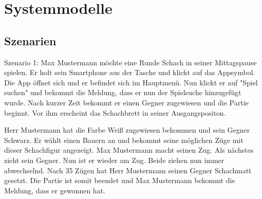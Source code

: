 \documentclass[parskip=full]{scrartcl}
\begin{document}
\section{Systemmodelle}
\subsection{Szenarien}
Szenario 1:
Max Mustermann möchte eine Runde Schach in seiner Mittagspause spielen. Er holt sein Smartphone aus der Tasche und klickt auf das Appsymbol.
Die App öffnet sich und er befindet sich im Hauptmenü. Nun klickt er auf "Spiel suchen" und bekommt die Meldung, dass er nun der Spielsuche hinzugefügt wurde.
Nach kurzer Zeit bekommt er einen Gegner zugewiesen und die Partie beginnt. Vor ihm erscheint das \gls{Schachbrett} in seiner Ausgangspositon.

Herr Mustermann hat die Farbe Weiß zugewiesen bekommen und sein Gegner Schwarz. Er wählt einen Bauern an und bekommt seine möglichen Züge mit dieser \gls{Schachfigur} angezeigt.
Max Mustermann macht seinen Zug. Als nächstes zieht sein Gegner. Nun ist er wieder am Zug. Beide ziehen nun immer abwechselnd. Nach 35 Zügen hat Herr Mustermann
seinen Gegner \gls{Schachmatt} gesetzt. Die Partie ist somit beendet und Max Mustermann bekommt die Meldung, dass er gewonnen hat.
\end{document}
